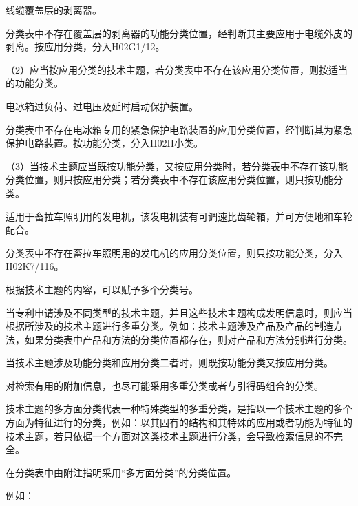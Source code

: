 {\par}

线缆覆盖层的剥离器。

分类表中不存在覆盖层的剥离器的功能分类位置，经判断其主要应用于电缆外皮的剥离。按应用分类，分入H02G1/12。

{\setlength{\parindent}{17.1bp}（2）应当按应用分类的技术主题，若分类表中不存在该应用分类位置，则按适当的功能分类。\par}

{\par}

电冰箱过负荷、过电压及延时启动保护装置。

分类表中不存在电冰箱专用的紧急保护电路装置的应用分类位置，经判断其为紧急保护电路装置。按功能分类，分入H02H小类。

{\setlength{\parindent}{17.1bp}（3）当技术主题应当既按功能分类，又按应用分类时，若分类表中不存在该功能分类位置，则只按应用分类；若分类表中不存在该应用分类位置，则只按功能分类。\par}

{\par}

适用于畜拉车照明用的发电机，该发电机装有可调速比齿轮箱，并可方便地和车轮配合。

分类表中不存在畜拉车照明用的发电机的应用分类位置，则只按功能分类，分入H02K7/116。

根据技术主题的内容，可以赋予多个分类号。

当专利申请涉及不同类型的技术主题，并且这些技术主题构成发明信息时，则应当根据所涉及的技术主题进行多重分类。例如：技术主题涉及产品及产品的制造方法，如果分类表中产品和方法的分类位置都存在，则对产品和方法分别进行分类。

当技术主题涉及功能分类和应用分类二者时，则既按功能分类又按应用分类。

对检索有用的附加信息，也尽可能采用多重分类或者与引得码组合的分类。

技术主题的多方面分类代表一种特殊类型的多重分类，是指以一个技术主题的多个方面为特征进行的分类，例如：以其固有的结构和其特殊的应用或者功能为特征的技术主题，若只依据一个方面对这类技术主题进行分类，会导致检索信息的不完全。

在分类表中由附注指明采用“多方面分类”的分类位置。

例如：

